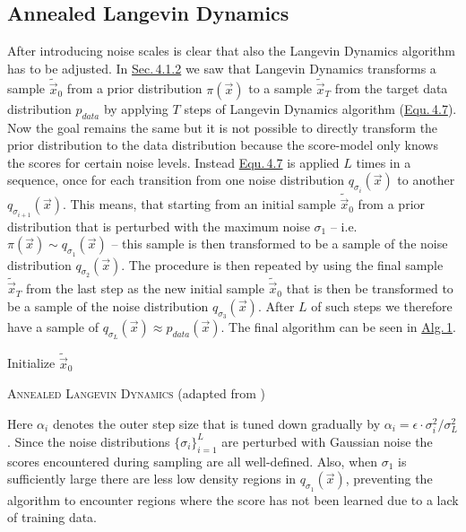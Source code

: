 \subsection{Annealed Langevin Dynamics} \label{4.3.2}
After introducing noise scales is clear that also the Langevin Dynamics algorithm has to be adjusted. In \hyperref[sec:4.1.2]{Sec.\,4.1.2} we saw that Langevin Dynamics transforms a sample $\tilde{\vec{x}}_0$ from a prior distribution $\pi(\vec{x})$ to a sample $\tilde{\vec{x}}_T$ from the target data distribution $p_{data}$ by applying $T$ steps of Langevin Dynamics algorithm (\hyperref[equ:4.7]{Equ.\,4.7}). Now the goal remains the same but it is not possible to directly transform the prior distribution to the data distribution because the score-model only knows the scores for certain noise levels. Instead \hyperref[equ:4.7]{Equ.\,4.7} is applied $L$ times in a sequence, once for each transition from one noise distribution $q_{\sigma_i}(\vec{x})$ to another $q_{\sigma_{i+1}}(\vec{x})$. This means, that starting from an initial sample $\tilde{\vec{x}}_0$ from a prior distribution that is perturbed with the maximum noise $\sigma_1$ – i.e. $\pi(\vec{x})\sim q_{\sigma_1}(\vec{x})$ – this sample is then transformed to be a sample of the noise distribution $q_{\sigma_{2}}(\vec{x})$. The procedure is then repeated by using the final sample $\tilde{\vec{x}}_T$ from the last step as the new initial sample $\tilde{\vec{x}}_0$ that is then be transformed to be a sample of the noise distribution $q_{\sigma_{3}}(\vec{x})$. After $L$ of such steps we therefore have a sample of $q_{\sigma_L}(\vec{x})\approx p_{data}(\vec{x})$. The final algorithm can be seen in \hyperref[alg:1]{Alg.\,1}.
%
\begin{algorithm} \label{alg:1}
    \DontPrintSemicolon
    Initialize $\tilde{\vec{x}}_0$\;
    \caption[Annealed Langevin Dynamics]{\textsc{Annealed Langevin Dynamics} (adapted from \cite{score_1})}
\end{algorithm}

Here $\alpha_i$ denotes the outer step size that is tuned down gradually by $\alpha_i=\epsilon\cdot\sigma_i^2/\sigma_L^2$. Since the noise distributions $\{\sigma_i\}_{i=1}^L$ are perturbed with Gaussian noise the scores encountered during sampling are all well-defined. Also, when $\sigma_1$ is sufficiently large there are less low density regions in $q_{\sigma_1}(\vec{x})$, preventing the algorithm to encounter regions where the score has not been learned due to a lack of training data.

